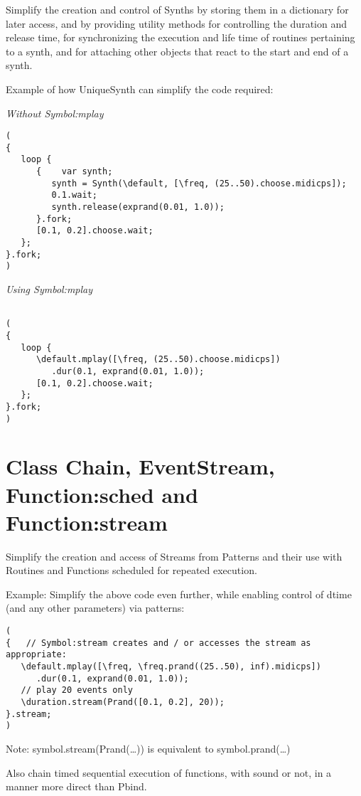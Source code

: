 \documentclass[11pt]{article}
\begin{document}
Simplify the creation and control of Synths by storing them in a dictionary for later access, and by providing utility methods for
controlling the duration and release time, for synchronizing the execution and life time of routines pertaining to a synth, and for attaching other objects that react to the start and end of a synth.

Example of how UniqueSynth can simplify the code required: 

\emph{Without Symbol:mplay}

\begin{verbatim}
(
{
   loop {
      {    var synth;
         synth = Synth(\default, [\freq, (25..50).choose.midicps]);
         0.1.wait;
         synth.release(exprand(0.01, 1.0));
      }.fork;
      [0.1, 0.2].choose.wait;
   };
}.fork;
)
\end{verbatim}

\emph{Using Symbol:mplay}

\begin{verbatim}

(
{
   loop {
      \default.mplay([\freq, (25..50).choose.midicps])
         .dur(0.1, exprand(0.01, 1.0));
      [0.1, 0.2].choose.wait;
   };
}.fork;
)
\end{verbatim}
\section{Class Chain, EventStream, Function:sched and Function:stream}
\label{sec-3}


Simplify the creation and access of Streams from Patterns and their use with Routines and Functions scheduled for repeated execution.  

Example: Simplify the above code even further, while enabling  control of dtime (and any other parameters) via patterns:

\begin{verbatim}
(
{   // Symbol:stream creates and / or accesses the stream as appropriate: 
   \default.mplay([\freq, \freq.prand((25..50), inf).midicps])
      .dur(0.1, exprand(0.01, 1.0));
   // play 20 events only
   \duration.stream(Prand([0.1, 0.2], 20)); 
}.stream;    
)
\end{verbatim}

Note: symbol.stream(Prand(\ldots{})) is equivalent to symbol.prand(\ldots{})

Also chain timed sequential execution of functions, with sound or not, in a manner more direct than Pbind.
\end{document}
